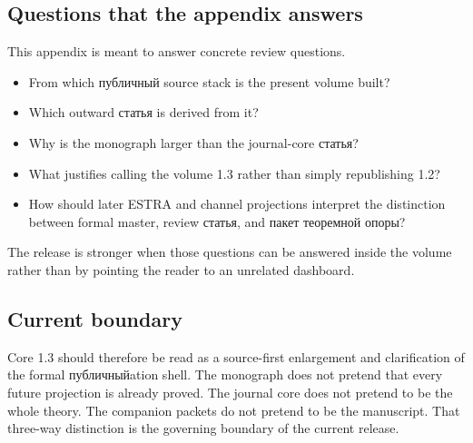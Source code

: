 \subsection{Questions that the appendix answers}

This appendix is meant to answer concrete review questions.

\begin{itemize}
\item From which публичный source stack is the present volume built?
\item Which outward статья is derived from it?
\item Why is the monograph larger than the journal-core статья?
\item What justifies calling the volume 1.3 rather than simply republishing 1.2?
\item How should later ESTRA and channel projections interpret the distinction between formal
      master, review статья, and пакет теоремной опоры?
\end{itemize}

The release is stronger when those questions can be answered inside the volume rather than by
pointing the reader to an unrelated dashboard.

\subsection{Current boundary}

Core 1.3 should therefore be read as a source-first enlargement and clarification of the formal
публичныйation shell.
The monograph does not pretend that every future projection is already proved.
The journal core does not pretend to be the whole theory.
The companion packets do not pretend to be the manuscript.
That three-way distinction is the governing boundary of the current release.

\clearpage
